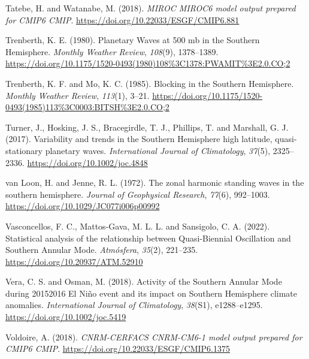 \documentclass[12pt,oneside,a4paper]{reedthesis}
\newlength{\cslhangindent}
\newenvironment{CSLReferences}[2] %
 {%
  \setlength{\parindent}{0pt}
  \ifodd #1 \everypar{\setlength{\hangindent}{\cslhangindent}}\ignorespaces\fi
  \ifnum #2 > 0
  \setlength{\parskip}{#2\baselineskip}
  \fi
 }%
 {}
\begin{document}
\begin{CSLReferences}{1}{0}
\leavevmode{}%
Tatebe, H. and Watanabe, M. (2018). \emph{MIROC MIROC6 model output prepared for CMIP6 CMIP}. \url{https://doi.org/10.22033/ESGF/CMIP6.881}

\leavevmode{}%
Trenberth, K. E. (1980). Planetary {Waves} at 500 mb in the {Southern Hemisphere}. \emph{Monthly Weather Review}, \emph{108}(9), 1378--1389. \url{https://doi.org/10.1175/1520-0493(1980)108\%3C1378:PWAMIT\%3E2.0.CO;2}

\leavevmode{}%
Trenberth, K. F. and Mo, K. C. (1985). Blocking in the {Southern Hemisphere}. \emph{Monthly Weather Review}, \emph{113}(1), 3--21. \url{https://doi.org/10.1175/1520-0493(1985)113\%3C0003:BITSH\%3E2.0.CO;2}

\leavevmode{}%
Turner, J., Hosking, J. S., Bracegirdle, T. J., Phillips, T. and Marshall, G. J. (2017). Variability and trends in the {Southern Hemisphere} high latitude, quasi-stationary planetary waves. \emph{International Journal of Climatology}, \emph{37}(5), 2325--2336. \url{https://doi.org/10.1002/joc.4848}

\leavevmode{}%
van Loon, H. and Jenne, R. L. (1972). The zonal harmonic standing waves in the southern hemisphere. \emph{Journal of Geophysical Research}, \emph{77}(6), 992--1003. \url{https://doi.org/10.1029/JC077i006p00992}

\leavevmode{}%
Vasconcellos, F. C., Mattos-Gava, M. L. L. and Sansigolo, C. A. (2022). Statistical analysis of the relationship between {Quasi-Biennial Oscillation} and {Southern Annular Mode}. \emph{Atm{ó}sfera}, \emph{35}(2), 221--235. \url{https://doi.org/10.20937/ATM.52910}

\leavevmode{}%
Vera, C. S. and Osman, M. (2018). Activity of the {Southern Annular Mode} during 2015{\textendash}2016 {El Ni{ñ}o} event and its impact on {Southern Hemisphere} climate anomalies. \emph{International Journal of Climatology}, \emph{38}(S1), e1288--e1295. \url{https://doi.org/10.1002/joc.5419}

\leavevmode{}%
Voldoire, A. (2018). \emph{CNRM-CERFACS CNRM-CM6-1 model output prepared for CMIP6 CMIP}. \url{https://doi.org/10.22033/ESGF/CMIP6.1375}


\end{CSLReferences}
\end{document}
